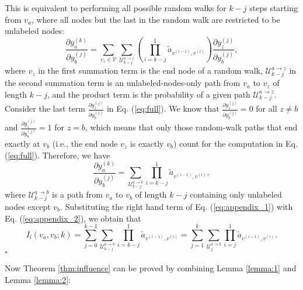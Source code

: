 \documentclass{article}
\newenvironment{proof}{{\noindent\it Proof.}\quad}{\hfill $\square$\par}
\begin{document}
\begin{proof}
			This is equivalent to performing all possible random walks for $k - j$ steps starting from $v_a$, where all nodes but the last in the random walk are restricted to be unlabeled nodes:
			\begin{equation}
			\label{eq:full}
				\frac{\partial y_a^{(k)}}{\partial y_b^{(j)}} = \sum_{v_z \in \mathcal V} \sum_{\mathcal U_{k-j}^{a \rightarrow z}} \left( \prod_{i=k-j}^1 \tilde a_{v^{(i-1)}, v^{(i)}} \right) \frac{\partial y_z^{(j)}}{\partial y_b^{(j)}},
			\end{equation}
			where $v_z$ in the first summation term is the end node of a random walk, $\mathcal U_{k-j}^{a \rightarrow z}$ in the second summation term is an unlabeled-nodes-only path from $v_a$ to $v_z$ of length $k-j$, and the product term is the probability of a given path $\mathcal U_{k-j}^{a \rightarrow z}$.
			Consider the last term $\frac{\partial y_z^{(j)}}{\partial y_b^{(j)}}$ in Eq. (\ref{eq:full}).
			We know that $\frac{\partial y_z^{(j)}}{\partial y_b^{(j)}} = 0$ for all $z \neq b$ and $\frac{\partial y_z^{(j)}}{\partial y_b^{(j)}} = 1$ for $z=b$, which means that only those random-walk paths that end exactly at $v_b$ (i.e., the end node $v_z$ is exactly $v_b$) count for the computation in Eq. (\ref{eq:full}).
			Therefore, we have
			\begin{equation}
			\label{eq:appendix_2}
				\frac{\partial y_a^{(k)}}{\partial y_b^{(j)}} = \sum_{\mathcal U_{k-j}^{a \rightarrow b}} \prod_{i=k-j}^1 \tilde a_{v^{(i-1)}, v^{(i)}},
			\end{equation}
			where $\mathcal U_{k-j}^{a \rightarrow b}$ is a path from $v_a$ to $v_b$ of length $k-j$ containing only unlabeled nodes except $v_b$.
			Substituting the right hand term of Eq. (\ref{eq:appendix_1}) with Eq. (\ref{eq:appendix_2}), we obtain that
			\begin{equation}
				I_l(v_a, v_b; k) = \sum_{j=0}^{k-1} \sum_{\mathcal U_{k-j}^{a \rightarrow b}} \prod_{i=k-j}^1 \tilde a_{v^{(i-1)}, v^{(i)}} = \sum_{j=1}^{k} \sum_{\mathcal U_j^{a \rightarrow b}} \prod_{i=j}^1 \tilde a_{v^{(i-1)}, v^{(i)}}.
			\end{equation}
		\end{proof}
		
		Now Theorem \ref{thm:influence} can be proved by combining Lemma \ref{lemma:1} and Lemma \ref{lemma:2}:
		
\end{document}

